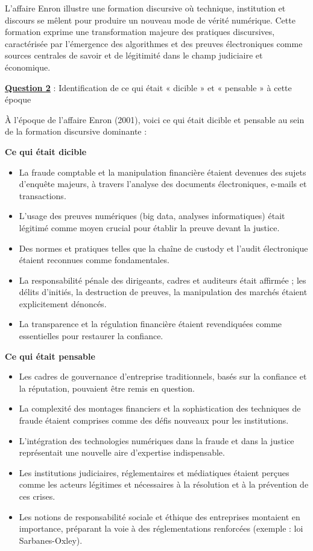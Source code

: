 \documentclass[12pt, a4paper]{article}
\newcommand{\question}[1]{\textbf{\underline{Question #1}}}
\begin{document}
\begin{enumerate}[label=\textbf{\arabic*.}]
		L'affaire Enron illustre une formation discursive où technique, institution et discours se mêlent pour produire un nouveau mode de vérité numérique. Cette formation exprime une transformation majeure des pratiques discursives, caractérisée par l'émergence des algorithmes et des preuves électroniques comme sources centrales de savoir et de légitimité dans le champ judiciaire et économique.
		
		\question{2} : Identification de ce qui était « dicible » et « pensable » à cette époque
		
		À l'époque de l'affaire Enron (2001), voici ce qui était dicible et pensable au sein de la formation discursive dominante :
		
		\textbf{Ce qui était dicible}
		\begin{itemize}
			\item La fraude comptable et la manipulation financière étaient devenues des sujets d'enquête majeurs, à travers l'analyse des documents électroniques, e-mails et transactions.
			\item L'usage des preuves numériques (big data, analyses informatiques) était légitimé comme moyen crucial pour établir la preuve devant la justice.
			\item Des normes et pratiques telles que la chaîne de custody et l'audit électronique étaient reconnues comme fondamentales.
			\item La responsabilité pénale des dirigeants, cadres et auditeurs était affirmée ; les délits d'initiés, la destruction de preuves, la manipulation des marchés étaient explicitement dénoncés.
			\item La transparence et la régulation financière étaient revendiquées comme essentielles pour restaurer la confiance.
		\end{itemize}
		
		\textbf{Ce qui était pensable}
		\begin{itemize}
			\item Les cadres de gouvernance d'entreprise traditionnels, basés sur la confiance et la réputation, pouvaient être remis en question.
			\item La complexité des montages financiers et la sophistication des techniques de fraude étaient comprises comme des défis nouveaux pour les institutions.
			\item L'intégration des technologies numériques dans la fraude et dans la justice représentait une nouvelle aire d'expertise indispensable.
			\item Les institutions judiciaires, réglementaires et médiatiques étaient perçues comme les acteurs légitimes et nécessaires à la résolution et à la prévention de ces crises.
			\item Les notions de responsabilité sociale et éthique des entreprises montaient en importance, préparant la voie à des réglementations renforcées (exemple : loi Sarbanes-Oxley).
		\end{itemize}
		

\end{enumerate}
\end{document}
